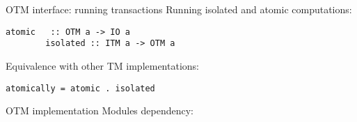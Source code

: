 \documentclass[beamer={noamsthm,10pt},target=bach]{thud}[2014/03/11]
\begin{document}
\begin{frame}[fragile]{OTM interface: running transactions}
Running isolated and atomic computations:
\begin{Verbatim}[tabsize=3, gobble=2]
        atomic   :: OTM a -> IO a
        isolated :: ITM a -> OTM a
\end{Verbatim}
Equivalence with other TM implementations:
\begin{Verbatim}[tabsize=3, gobble=2]
        atomically = atomic . isolated
\end{Verbatim}
\end{frame}

\begin{frame}[fragile]{OTM implementation}
Modules dependency:
\begin{figure}
\centering
\end{figure}
\end{frame}
\end{document}
